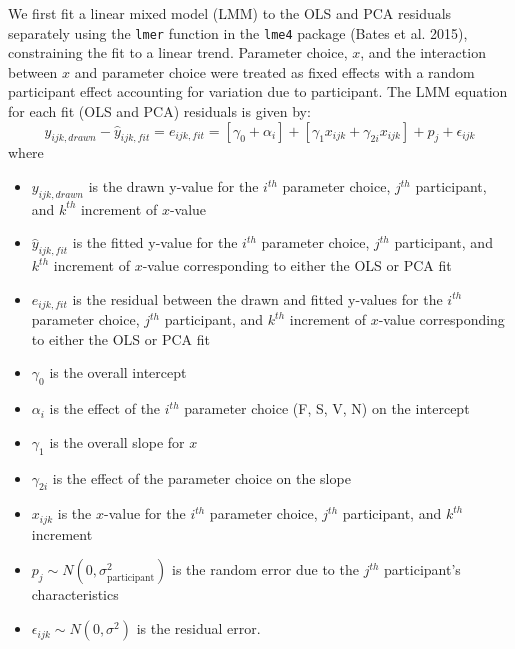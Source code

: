 \documentclass[
]{jds}
\providecommand{\tightlist}{%
  \setlength{\itemsep}{0pt}\setlength{\parskip}{0pt}}\usepackage{longtable,booktabs,array}
\begin{document}
We first fit a linear mixed model (LMM) to the OLS and PCA residuals
separately using the \texttt{lmer} function in the \texttt{lme4} package
(Bates et al. 2015), constraining the fit to a linear trend. Parameter
choice, \(x\), and the interaction between \(x\) and parameter choice
were treated as fixed effects with a random participant effect
accounting for variation due to participant. The LMM equation for each
fit (OLS and PCA) residuals is given by: \begin{equation}
y_{ijk,drawn} - \hat y_{ijk,fit} = e_{ijk,fit} = \left[\gamma_0 + \alpha_i\right] + \left[\gamma_{1} x_{ijk} + \gamma_{2i} x_{ijk}\right] + p_{j} + \epsilon_{ijk}
\end{equation} \noindent where

\begin{itemize}
\tightlist
\item
  \(y_{ijk,drawn}\) is the drawn y-value for the \(i^{th}\) parameter
  choice, \(j^{th}\) participant, and \(k^{th}\) increment of
  \(x\)-value
\item
  \(\hat y_{ijk,fit}\) is the fitted y-value for the \(i^{th}\)
  parameter choice, \(j^{th}\) participant, and \(k^{th}\) increment of
  \(x\)-value corresponding to either the OLS or PCA fit
\item
  \(e_{ijk,fit}\) is the residual between the drawn and fitted y-values
  for the \(i^{th}\) parameter choice, \(j^{th}\) participant, and
  \(k^{th}\) increment of \(x\)-value corresponding to either the OLS or
  PCA fit
\item
  \(\gamma_0\) is the overall intercept
\item
  \(\alpha_i\) is the effect of the \(i^{th}\) parameter choice (F, S,
  V, N) on the intercept
\item
  \(\gamma_1\) is the overall slope for \(x\)
\item
  \(\gamma_{2i}\) is the effect of the parameter choice on the slope
\item
  \(x_{ijk}\) is the \(x\)-value for the \(i^{th}\) parameter choice,
  \(j^{th}\) participant, and \(k^{th}\) increment
\item
  \(p_{j} \sim N(0, \sigma^2_\text{participant})\) is the random error
  due to the \(j^{th}\) participant's characteristics
\item
  \(\epsilon_{ijk} \sim N(0, \sigma^2)\) is the residual error.
\end{itemize}
\end{document}

